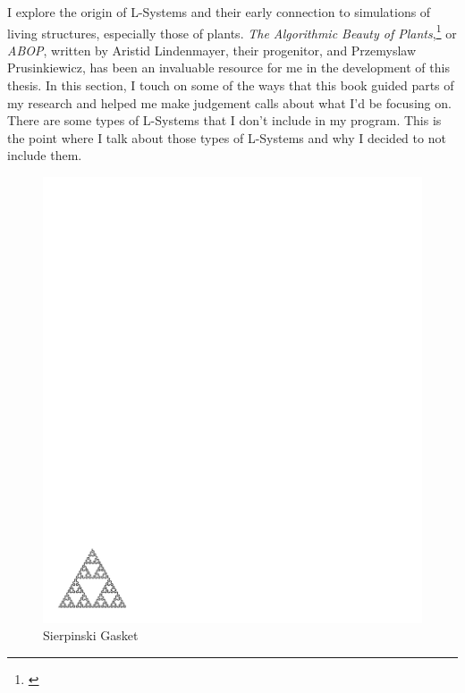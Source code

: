 \documentclass[12pt,twoside]{reedthesis}
\begin{document}
	I explore the origin of L-Systems and their early connection to simulations of living structures, especially those of plants. \textit{The Algorithmic Beauty of Plants},\footnote{\cite{ABOP1990}} or \textit{ABOP}, written by Aristid Lindenmayer, their progenitor, and Przemyslaw Prusinkiewicz, has been an invaluable resource for me in the development of this thesis. In this section, I touch on some of the ways that this book guided parts of my research and helped me make judgement calls about what I'd be focusing on. There are some types of L-Systems that I don't include in my program. This is the point where I talk about those types of L-Systems and why I decided to not include them.
	
	
	\begin{figure}[h]
	\centering
	\includegraphics[clip=true, viewport=0in 0.3in 2.5in 2in, scale=1.4]{Images/Sierpinski} %
	\caption[Sierpinski Gasket]{Sierpinski Gasket\footnotemark}
	\label {Sierpinski}
	\end{figure}
	
\end{document}

